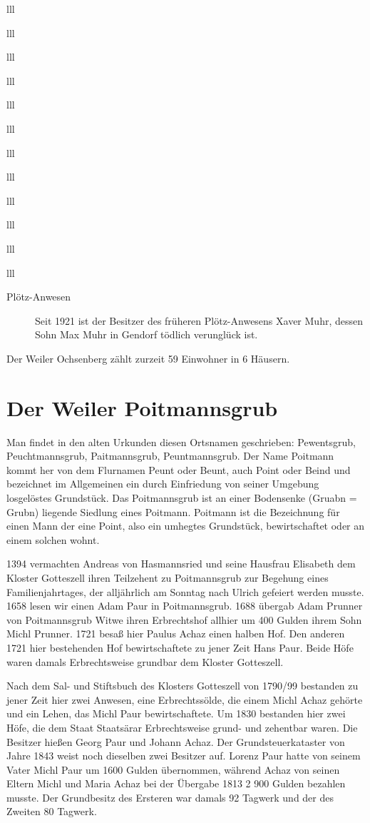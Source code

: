 \documentclass[12pt,a4pager]{book}
\begin{document}
\begin{tabuluar}{lll}
\begin{tabuluar}{lll}
\begin{tabuluar}{lll}
\begin{tabuluar}{lll}
\begin{tabuluar}{lll}
\begin{tabuluar}{lll}
\begin{tabuluar}{lll}
\begin{tabuluar}{lll}
\begin{tabuluar}{lll}
\begin{tabuluar}{lll}
\begin{tabuluar}{lll}
\begin{tabuluar}{lll}
\begin{description}
\item[Plötz-Anwesen] Seit 1921 ist der Besitzer des früheren Plötz-Anwesens
Xaver Muhr, dessen Sohn Max Muhr in Gendorf tödlich verunglück ist.
\end{description}

Der Weiler Ochsenberg zählt zurzeit 59 Einwohner in 6 Häusern.

\section{Der Weiler Poitmannsgrub}

Man findet in den alten Urkunden diesen Ortsnamen geschrieben: Pewentsgrub,
Peuchtmannsgrub, Paitmannsgrub, Peuntmannsgrub. Der Name Poitmann kommt her von
dem Flurnamen Peunt oder Beunt, auch Point oder Beind und bezeichnet im
Allgemeinen ein durch Einfriedung von seiner Umgebung losgelöstes Grundstück.
Das Poitmannsgrub ist an einer Bodensenke (Gruabn = Grubn) liegende Siedlung
eines Poitmann. Poitmann ist die Bezeichnung für einen Mann der eine Point, also
ein umhegtes Grundstück, bewirtschaftet oder an einem solchen wohnt.

1394 vermachten Andreas von Hasmannsried und seine Hausfrau Elisabeth dem
Kloster Gotteszell ihren Teilzehent zu Poitmannsgrub zur Begehung eines
Familienjahrtages, der alljährlich am Sonntag nach Ulrich gefeiert werden
musste. 1658 lesen wir einen Adam Paur in Poitmannsgrub. 1688 übergab Adam
Prunner von Poitmannsgrub Witwe ihren Erbrechtshof allhier um 400 Gulden ihrem
Sohn Michl Prunner. 1721 besaß hier Paulus Achaz einen halben Hof. Den anderen
1721 hier bestehenden Hof bewirtschaftete zu jener Zeit Hans Paur. Beide Höfe
waren damals Erbrechtsweise grundbar dem Kloster Gotteszell.

Nach dem Sal- und Stiftsbuch des Klosters Gotteszell von 1790/99 bestanden zu
jener Zeit hier zwei Anwesen, eine Erbrechtssölde, die einem Michl Achaz gehörte
und ein Lehen, das Michl Paur bewirtschaftete. Um 1830 bestanden hier zwei Höfe,
die dem Staat Staatsärar Erbrechtsweise grund- und zehentbar waren. Die Besitzer
hießen Georg Paur und Johann Achaz. Der Grundsteuerkataster von Jahre 1843 weist
noch dieselben zwei Besitzer auf. Lorenz Paur hatte von seinem Vater Michl Paur
um 1600 Gulden übernommen, während Achaz von seinen Eltern Michl und Maria Achaz
bei der Übergabe 1813 2 900 Gulden bezahlen musste. Der Grundbesitz des Ersteren
war damals 92 Tagwerk und der des Zweiten 80 Tagwerk.


\end{tabuluar}
\end{tabuluar}
\end{tabuluar}
\end{tabuluar}
\end{tabuluar}
\end{tabuluar}
\end{tabuluar}
\end{tabuluar}
\end{tabuluar}
\end{tabuluar}
\end{tabuluar}
\end{tabuluar}
\end{document}
